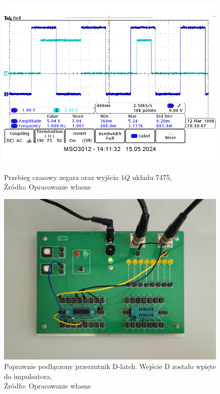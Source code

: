 \documentclass{article}
\begin{document}
      \begin{figure}[!ht]
        \begin{minipage}{.5\textwidth}
          \centering
          \includegraphics[scale=0.35]{grafiki/5.3_CLK_Q_D_latch.png}
          \caption{Przebieg czasowy zegara oraz wyjścia $1Q$ układu 7475,
          \\Źródło: Opracowanie własne}
        \end{minipage}
        \begin{minipage}{.5\textwidth}
          \centering
          \includegraphics[scale=0.1]{grafiki/Przerzutnik_D_latch_zdj.png}
          \caption{Poprawnie podłączony przerzutnik D-latch. Wejście D zostało wpięte do impulsatora,
          \\Źródło: Opracowanie własne}
        \end{minipage}
      \end{figure}
\end{document}
